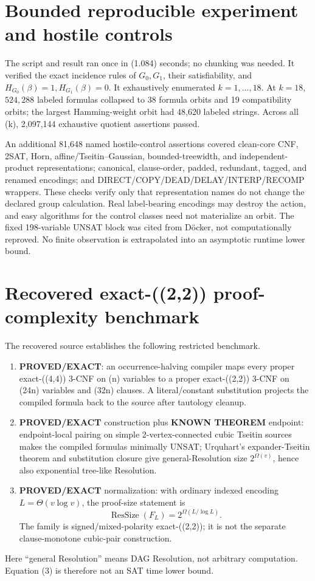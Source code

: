 \documentclass[11pt]{article}
\newcommand{\EXACT}{\textbf{PROVED/EXACT}}
\newcommand{\KNOWN}{\textbf{KNOWN THEOREM}}
\begin{document}
\section{Bounded reproducible experiment and hostile controls}
The script
 and result
 ran once
in (1.084) seconds; no chunking was needed.  It verified the exact
incidence rules of \(G_0,G_1\), their satisfiability, and
\(H_{G_0}(\beta)=1,H_{G_1}(\beta)=0\).  It exhaustively enumerated
\(k=1,\ldots,18\).  At \(k=18\), \(524{,}288\) labeled formulas collapsed to
38 formula orbits and 19 compatibility orbits; the largest Hamming-weight
orbit had 48,620 labeled strings.  Across all (k), 2,097,144 exhaustive
quotient assertions passed.

An additional 81,648 named hostile-control assertions covered clean-core CNF,
2SAT, Horn, affine/Tseitin--Gaussian, bounded-treewidth, and independent-product
representations; canonical, clause-order, padded, redundant, tagged, and
renamed encodings; and DIRECT/COPY/DEAD/DELAY/INTERP/RECOMP wrappers.  These
checks verify only that representation names do not change the declared group
calculation.  Real label-bearing encodings may destroy the action, and easy
algorithms for the control classes need not materialize an orbit.  The fixed
198-variable UNSAT block was cited from D\"ocker, not computationally
reproved.  No finite observation is extrapolated into an asymptotic runtime
lower bound.

\section{Recovered exact-((2,2)) proof-complexity benchmark}
The recovered source establishes the following restricted benchmark.
\begin{enumerate}[label=R\arabic*.]
\item \EXACT: an occurrence-halving compiler maps every proper exact-((4,4))
3-CNF on (n) variables to a proper exact-((2,2)) 3-CNF on (24n)
variables and (32n) clauses.  A literal/constant substitution projects the
compiled formula back to the source after tautology cleanup.
\item \EXACT{} construction plus \KNOWN{} endpoint: endpoint-local pairing
on simple 2-vertex-connected cubic Tseitin sources makes the compiled formulas
minimally UNSAT; Urquhart's expander-Tseitin theorem and substitution closure
give general-Resolution size \(2^{\Omega(v)}\), hence also exponential
tree-like Resolution.
\item \EXACT{} normalization: with ordinary indexed encoding
\(L=\Theta(v\log v)\), the proof-size statement is
\[
 \operatorname{ResSize}(F_L)=2^{\Omega(L/\log L)}.            \tag{3}
\]
The family is signed/mixed-polarity exact-((2,2)); it is not the separate
clause-monotone cubic-pair construction.
\end{enumerate}
Here ``general Resolution'' means DAG Resolution, not arbitrary computation.
Equation (3) is therefore not an SAT time lower bound.
\end{document}
